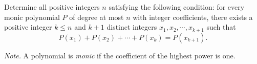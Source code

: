 Determine all positive integers $n$ satisfying the following condition: for every monic polynomial $P$ of degree at most $n$ with integer coefficients, there exists a positive integer $k\le n$ and $k+1$ distinct integers $x_1,x_2,\cdots ,x_{k+1}$ such that \[P(x_1)+P(x_2)+\cdots +P(x_k)=P(x_{k+1}).\]

\emph{Note. }A polynomial is \emph{monic} if the coefficient of the highest power is one.